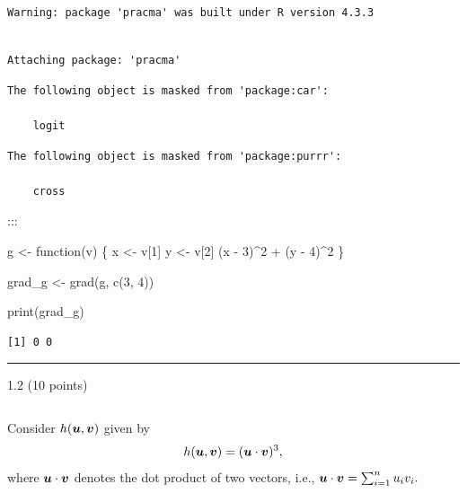 \documentclass[
  letterpaper,
  DIV=11,
  numbers=noendperiod]{scrartcl}
\newenvironment{Shaded}{\begin{snugshade}}{\end{snugshade}}
\newcommand{\ControlFlowTok}[1]{\textcolor[rgb]{0.00,0.23,0.31}{#1}}
\newcommand{\DecValTok}[1]{\textcolor[rgb]{0.68,0.00,0.00}{#1}}
\newcommand{\FunctionTok}[1]{\textcolor[rgb]{0.28,0.35,0.67}{#1}}
\newcommand{\NormalTok}[1]{\textcolor[rgb]{0.00,0.23,0.31}{#1}}
\newcommand{\OtherTok}[1]{\textcolor[rgb]{0.00,0.23,0.31}{#1}}
\newcommand{\SpecialCharTok}[1]{\textcolor[rgb]{0.37,0.37,0.37}{#1}}
\begin{document}
\begin{verbatim}
Warning: package 'pracma' was built under R version 4.3.3
\end{verbatim}

\begin{verbatim}

Attaching package: 'pracma'
\end{verbatim}

\begin{verbatim}
The following object is masked from 'package:car':

    logit
\end{verbatim}

\begin{verbatim}
The following object is masked from 'package:purrr':

    cross
\end{verbatim}

:::

\begin{Shaded}
\begin{Highlighting}[]
\NormalTok{g }\OtherTok{\textless{}{-}} \ControlFlowTok{function}\NormalTok{(v) \{}
\NormalTok{  x }\OtherTok{\textless{}{-}}\NormalTok{ v[}\DecValTok{1}\NormalTok{]}
\NormalTok{  y }\OtherTok{\textless{}{-}}\NormalTok{ v[}\DecValTok{2}\NormalTok{]}
\NormalTok{  (x }\SpecialCharTok{{-}} \DecValTok{3}\NormalTok{)}\SpecialCharTok{\^{}}\DecValTok{2} \SpecialCharTok{+}\NormalTok{ (y }\SpecialCharTok{{-}} \DecValTok{4}\NormalTok{)}\SpecialCharTok{\^{}}\DecValTok{2}
\NormalTok{\}}


\NormalTok{grad\_g }\OtherTok{\textless{}{-}} \FunctionTok{grad}\NormalTok{(g, }\FunctionTok{c}\NormalTok{(}\DecValTok{3}\NormalTok{, }\DecValTok{4}\NormalTok{))}

\FunctionTok{print}\NormalTok{(grad\_g)}
\end{Highlighting}
\end{Shaded}

\begin{verbatim}
[1] 0 0
\end{verbatim}

\begin{center}\rule{0.5\linewidth}{0.5pt}\end{center}

1.2 (10 points)

\[
\newcommand{\u}{\boldsymbol{u}}\newcommand{\v}{\boldsymbol{v}}
\]

Consider \(h(\u, \v)\) given by \[
h(\u, \v) = (\u \cdot \v)^3,
\] where \(\u \cdot \v\) denotes the dot product of two vectors, i.e.,
\(\u \cdot \v = \sum_{i=1}^n u_i v_i.\)
\end{document}

